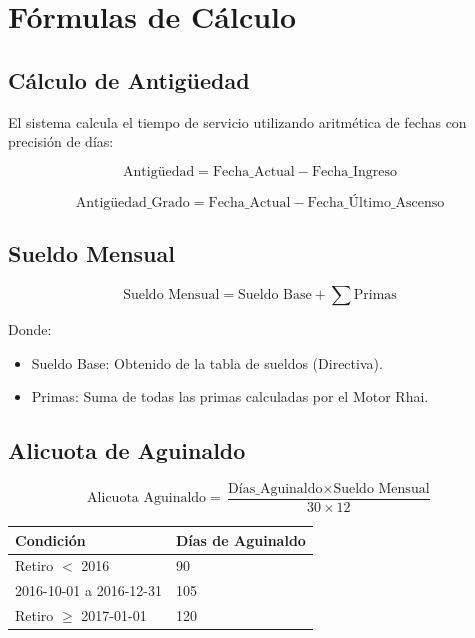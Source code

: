 \bigskip

\section{Fórmulas de Cálculo}

\subsection{Cálculo de Antigüedad}

El sistema calcula el tiempo de servicio utilizando aritmética de fechas con precisión de días:

\[
\text{Antigüedad} = \text{Fecha\_Actual} - \text{Fecha\_Ingreso}
\]

\[
\text{Antigüedad\_Grado} = \text{Fecha\_Actual} - \text{Fecha\_Último\_Ascenso}
\]

\bigskip

\subsection{Sueldo Mensual}

\[
\text{Sueldo Mensual} = \text{Sueldo Base} + \sum \text{Primas}
\]

Donde:
\begin{itemize}
    \item Sueldo Base: Obtenido de la tabla de sueldos (Directiva).
    \item Primas: Suma de todas las primas calculadas por el Motor Rhai.
\end{itemize}

\bigskip

\subsection{Alicuota de Aguinaldo}

\[
\text{Alicuota Aguinaldo} = \frac{\text{Días\_Aguinaldo} \times \text{Sueldo Mensual}}{30 \times 12}
\]

\bigskip

\begin{center}
\begin{tabular}{ll}
\toprule
\textbf{Condición} & \textbf{Días de Aguinaldo} \\
\midrule
Retiro $<$ 2016 & 90 \\
2016-10-01 a 2016-12-31 & 105 \\
Retiro $\ge$ 2017-01-01 & 120 \\
\bottomrule
\end{tabular}
\end{center}

